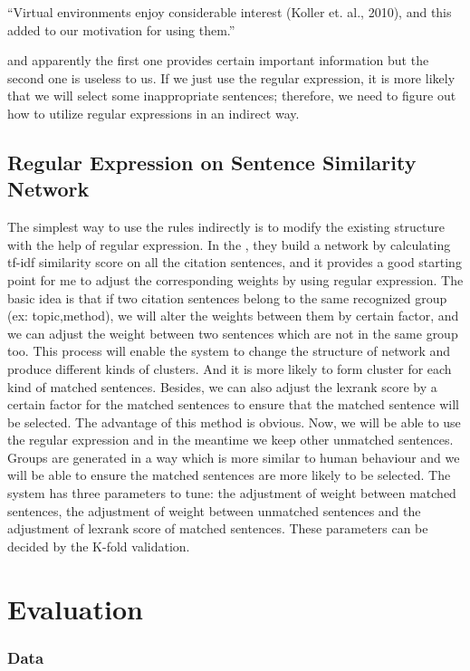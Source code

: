 \documentclass[hyp]{socreport}
\begin{document}
“Virtual environments enjoy considerable interest (Koller et. al., 2010), and this added to our motivation for using them.”

and apparently the first one provides certain important information but the second one is useless to us. If we just use the regular expression, it is more likely that we will select some inappropriate sentences; therefore, we need to figure out how to utilize regular expressions in an indirect way. 

\subsection{Regular Expression on Sentence Similarity Network}
 	
The simplest way to use the rules indirectly is to modify the existing structure with the help of regular expression. In the \citep{qazvinian2008},  they build a network by calculating tf-idf similarity score on all the citation sentences, and it provides a good starting point for me to adjust the corresponding weights by using regular expression. The basic idea is that if two citation sentences belong to the same recognized group (ex: topic,method), we will alter the weights between them by certain factor, and we can adjust the weight between two sentences which are not in the same group too. This process will enable the system to change the structure of network and produce different kinds of clusters. And it is more likely to form cluster for each kind of matched sentences. Besides, we can also adjust the lexrank score by a certain factor for the matched sentences to ensure that the matched sentence will be selected. The advantage of this method is obvious. Now, we will be able to use the regular expression and in the meantime we keep other unmatched sentences. Groups are generated in a way which is more similar to human behaviour and we will be able to ensure the matched sentences are more likely to be selected. The system has three parameters to tune: the adjustment of weight between matched sentences, the adjustment of weight between unmatched sentences and the adjustment of lexrank score of matched sentences. These parameters can be decided by the K-fold validation.

\section{Evaluation}

\subsubsection{Data}
\end{document}
